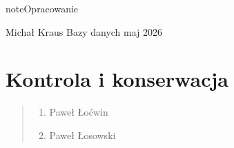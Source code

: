 \documentclass[letterpaper,10pt,polish]{sphinxmanual}
\begin{document}
\begin{sphinxadmonition}{note}{Opracowanie}

\sphinxAtStartPar
{} Michał Kraus
 Bazy danych
 maj 2026
\end{sphinxadmonition}

\sphinxstepscope


\section{Kontrola i konserwacja}
\label{\detokenize{rozdzia_u0142_2/rozdzia_u0142_23/index:kontrola-i-konserwacja}}\label{\detokenize{rozdzia_u0142_2/rozdzia_u0142_23/index::doc}}\begin{quote}\begin{description}
\begin{enumerate}
%
\item {} 
\sphinxAtStartPar
Paweł Łoćwin

\item {} 
\sphinxAtStartPar
Paweł Łosowski

\end{enumerate}

\end{description}\end{quote}
\end{document}
